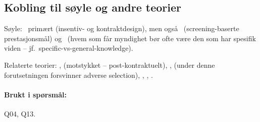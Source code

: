 \subsection*{Kobling til søyle og andre teorier}
Søyle: \SThree\ primært (insentiv- og kontraktdesign), men også \STwo\ (screening-baserte prestasjonsmål) og \SOne\ (hvem som får myndighet bør ofte være den som har spesifik viden -- jf.\ specific-vs-general-knowledge).

Relaterte teorier: ,  (motstykket -- post-kontraktuelt), ,  (under denne forutsetningen forsvinner adverse selection), , , .

\paragraph{Brukt i spørsmål:} Q04, Q13.
